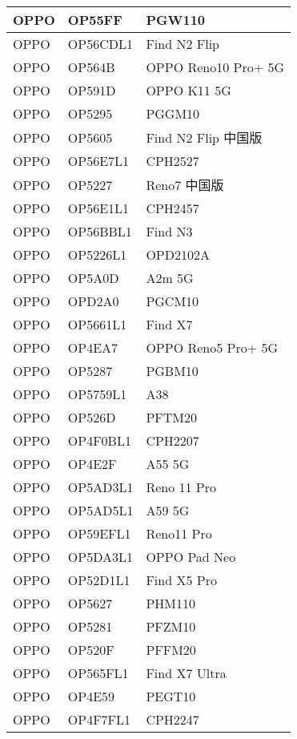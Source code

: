 \begin{tabularx}{\linewidth}{|l|X|X|}
        OPPO & OP55FF & PGW110 \\ \hline
        OPPO & OP56CDL1 & Find N2 Flip \\ \hline
        OPPO & OP564B & OPPO Reno10 Pro+ 5G \\ \hline
        OPPO & OP591D & OPPO K11 5G \\ \hline
        OPPO & OP5295 & PGGM10 \\ \hline
        OPPO & OP5605 & Find N2 Flip 中国版 \\ \hline
        OPPO & OP56E7L1 & CPH2527 \\ \hline
        OPPO & OP5227 & Reno7 中国版 \\ \hline
        OPPO & OP56E1L1 & CPH2457 \\ \hline
        OPPO & OP56BBL1 & Find N3 \\ \hline
        OPPO & OP5226L1 & OPD2102A \\ \hline
        OPPO & OP5A0D & A2m 5G \\ \hline
        OPPO & OPD2A0 & PGCM10 \\ \hline
        OPPO & OP5661L1 & Find X7 \\ \hline
        OPPO & OP4EA7 & OPPO Reno5 Pro+ 5G \\ \hline
        OPPO & OP5287 & PGBM10 \\ \hline
        OPPO & OP5759L1 & A38 \\ \hline
        OPPO & OP526D & PFTM20 \\ \hline
        OPPO & OP4F0BL1 & CPH2207 \\ \hline
        OPPO & OP4E2F & A55 5G \\ \hline
        OPPO & OP5AD3L1 & Reno 11 Pro \\ \hline
        OPPO & OP5AD5L1 & A59 5G \\ \hline
        OPPO & OP59EFL1 & Reno11 Pro \\ \hline
        OPPO & OP5DA3L1 & OPPO Pad Neo \\ \hline
        OPPO & OP52D1L1 & Find X5 Pro \\ \hline
        OPPO & OP5627 & PHM110 \\ \hline
        OPPO & OP5281 & PFZM10 \\ \hline
        OPPO & OP520F & PFFM20 \\ \hline
        OPPO & OP565FL1 & Find X7 Ultra \\ \hline
        OPPO & OP4E59 & PEGT10 \\ \hline
        OPPO & OP4F7FL1 & CPH2247 \\ \hline

\end{tabularx}
